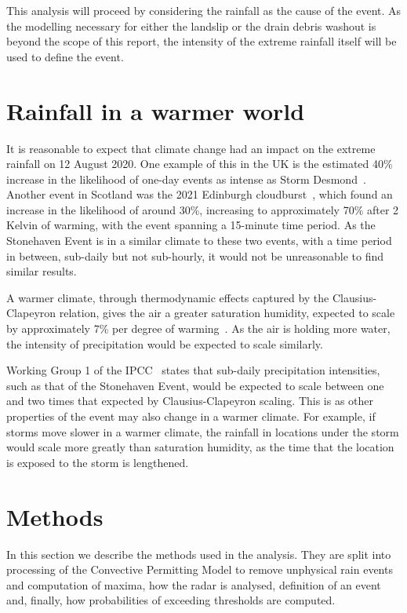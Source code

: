 \documentclass[11pt,a4paper]{article}
\begin{document}
This analysis will proceed by considering the rainfall as the cause of the event.
As the modelling necessary for either the landslip or the drain debris washout is beyond the scope of this report,
the intensity of the extreme rainfall itself will be used to define the event.

\section{Rainfall in a warmer world}\label{sec:warmerrainfall}

It is reasonable to expect that climate change had an impact on the extreme rainfall on 12 August 2020.
One example of this in the UK is the estimated 40\% increase
in the likelihood of one-day events as intense as Storm Desmond~\cite{Desmond_2015}.
Another event in Scotland was the 2021 Edinburgh cloudburst~\cite{tett2023edinburgh},
which found an increase in the likelihood of around 30\%,
increasing to approximately 70\% after 2 Kelvin of warming,
with the event spanning a 15-minute time period.
As the Stonehaven Event is in a similar climate to these two events,
with a time period in between,
sub-daily but not sub-hourly,
it would not be unreasonable to find similar results.

A warmer climate,
through thermodynamic effects captured by the Clausius-Clapeyron relation,
gives the air a greater saturation humidity,
expected to scale by approximately 7\% per degree of warming~\cite{Fowler_2021}.
As the air is holding more water,
the intensity of precipitation would be expected to scale similarly.

Working Group 1 of the IPCC~\cite{IPCC_2021} states that sub-daily precipitation intensities,
such as that of the Stonehaven Event,
would be expected to scale between one and two times that expected by Clausius-Clapeyron scaling.
This is as other properties of the event may also change in a warmer climate.
For example,
if storms move slower in a warmer climate,
the rainfall in locations under the storm would scale more greatly than saturation humidity,
as the time that the location is exposed to the storm is lengthened.

\section{Methods}
In this section we describe the methods used in the analysis. They are split into processing of the Convective Permitting Model to remove unphysical rain events  and computation of maxima, how the radar is analysed, definition of an event and, finally, how probabilities of exceeding thresholds are computed. 
\end{document}
